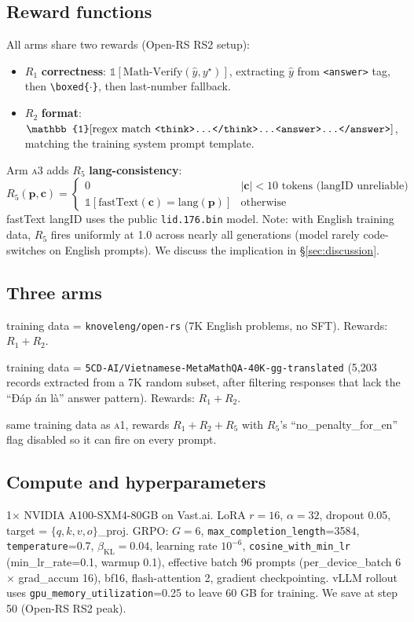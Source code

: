 \documentclass[11pt]{article}
\newcommand{\armA}{\textsc{a1}}
\newcommand{\armB}{\textsc{a2}}
\newcommand{\armC}{\textsc{a3}}
\begin{document}
\subsection{Reward functions}
\label{sec:rewards}
All arms share two rewards (Open-RS RS2 setup):
\begin{itemize}\itemsep0pt
\item $R_1$ \textbf{correctness}: $\mathbb{1}[\text{Math-Verify}(\hat{y}, y^\star)]$,
extracting $\hat{y}$ from \texttt{<answer>} tag, then \texttt{\textbackslash boxed\{$\cdot$\}},
then last-number fallback.
\item $R_2$ \textbf{format}: $\mathbb{1}[\text{regex match
  \texttt{<think>...</think>...<answer>...</answer>}}]$, matching the
training system prompt template.
\end{itemize}
Arm \armC{} adds $R_5$ \textbf{lang-consistency}:
\[ R_5(\textbf{p}, \textbf{c}) = \begin{cases}
0 & |\textbf{c}| < 10 \text{ tokens (langID unreliable)} \\
\mathbb{1}[\text{fastText}(\textbf{c}) = \text{lang}(\textbf{p})] & \text{otherwise}
\end{cases} \]
fastText langID uses the public \texttt{lid.176.bin} model. Note: with English
training data, $R_5$ fires uniformly at 1.0 across nearly all generations
(model rarely code-switches on English prompts). We discuss the implication in §\ref{sec:discussion}.

\subsection{Three arms}
\begin{description}\itemsep0pt
\item[\armA{} (English-only):] training data = \texttt{knoveleng/open-rs}
(7K English problems, no SFT). Rewards: $R_1+R_2$.
\item[\armB{} (Vietnamese-translated):] training data =
\texttt{5CD-AI/Vietnamese-MetaMathQA-40K-gg-translated} (5{,}203 records extracted
from a 7K random subset, after filtering responses that lack the
``Đáp án là'' answer pattern). Rewards: $R_1+R_2$.
\item[\armC{} (English + $R_5$):] same training data as \armA{}, rewards
$R_1+R_2+R_5$ with $R_5$'s ``no\_penalty\_for\_en'' flag disabled so it can fire
on every prompt.
\end{description}

\subsection{Compute and hyperparameters}
1$\times$ NVIDIA A100-SXM4-80GB on Vast.ai. LoRA $r{=}16$,
$\alpha{=}32$, dropout 0.05, target = $\{q, k, v, o\}$\_proj. GRPO: $G{=}6$,
\texttt{max\_completion\_length}{=}3584, \texttt{temperature}{=}0.7,
$\beta_{\text{KL}}{=}0.04$, learning rate $10^{-6}$,
\texttt{cosine\_with\_min\_lr} (min\_lr\_rate=0.1, warmup 0.1), effective batch
96 prompts (per\_device\_batch 6 $\times$ grad\_accum 16), bf16, flash-attention 2,
gradient checkpointing. vLLM rollout uses \texttt{gpu\_memory\_utilization}=0.25
to leave 60 GB for training. We save at step 50 (Open-RS RS2 peak).
\end{document}
